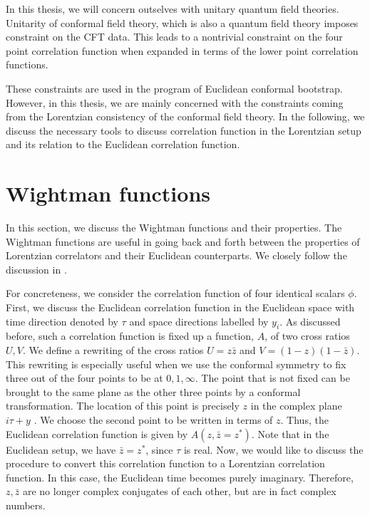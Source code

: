 In this thesis, we will concern outselves with unitary quantum field theories.
Unitarity of conformal field theory, which is also a quantum field theory imposes constraint on the CFT data.
This leads to a nontrivial constraint on the four point correlation function when expanded in terms of the lower point correlation functions.

These constraints are used in the program of Euclidean conformal bootstrap.
However, in this thesis, we are mainly concerned with the constraints coming from the Lorentzian consistency of the conformal field theory.
In the following, we discuss the necessary tools to discuss correlation function in the Lorentzian setup and its relation to the Euclidean correlation function.


\section{Wightman functions}
In this section, we discuss the Wightman functions and their properties.
The Wightman functions are useful in going back and forth between the properties of Lorentzian correlators and their Euclidean counterparts.
We closely follow the discussion in \cite{Hartman:2015lfa}.

For concreteness, we consider the correlation function of four identical scalars $ \phi $.
First, we discuss the Euclidean correlation function in the Euclidean space with time direction denoted by $ \tau $ and space directions labelled by $ y_i $.
As discussed before, such a correlation function is fixed up a function, $ A $, of two cross ratios $ U,V $.
We define a rewriting of the cross ratios $ U  = z \bar{z}$ and $ V = \left( 1-z \right) \left( 1-\bar{z} \right) $.
This rewriting is especially useful when we use the conformal symmetry to fix three out of the four points to be at $ 0,1,\infty $.
The point that is not fixed can be brought to the same plane as the other three points by a conformal transformation.
The location of this point is precisely $ z $ in the complex plane $i \tau + y $ .
We choose the second point to be written in terms of $ z $.
Thus, the Euclidean correlation function is given by $ A\left( z,\bar{z}=z^* \right) $.
Note that in the Euclidean setup, we have $ \bar{z} = z^* $, since $ \tau $ is real.
Now, we would like to discuss the procedure to convert this correlation function to a Lorentzian correlation function.
In this case, the Euclidean time becomes purely imaginary.
Therefore, $ z,\bar{z} $ are no longer complex conjugates of each other, but are in fact complex numbers.

